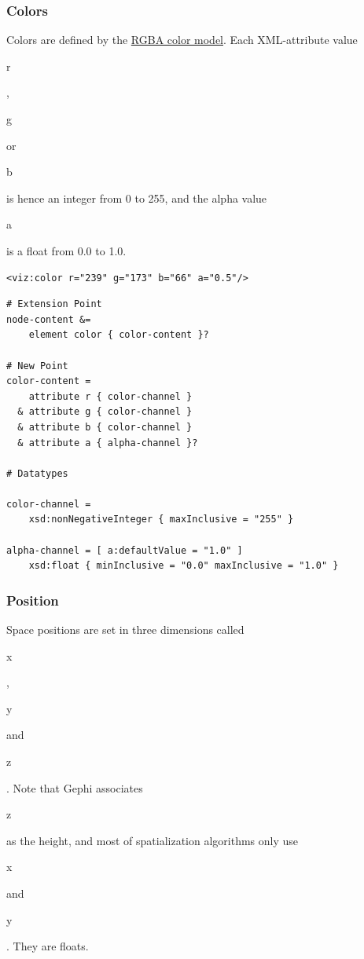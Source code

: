 \documentclass[a4paper,10pt]{article}
\begin{document}
\subsubsection{Colors}

Colors are defined by the \href{http://en.wikipedia.org/wiki/RGBA}{RGBA color model}. Each XML-attribute value \begin{footnotesize}r\end{footnotesize}, \begin{footnotesize}g\end{footnotesize} or \begin{footnotesize}b\end{footnotesize} is hence an integer from 0 to 255, and the alpha value \begin{footnotesize}a\end{footnotesize} is a float from 0.0 to 1.0.

\lstset{ style=gexf }
\begin{lstlisting}[caption={VIZ Color Declaration},label=vizcolor]
<viz:color r="239" g="173" b="66" a="0.5"/>
\end{lstlisting}

\lstset{ style=rnc }
\begin{lstlisting}[caption={Color Specification},label=colorRNC]
# Extension Point
node-content &=
    element color { color-content }?

# New Point
color-content =
    attribute r { color-channel }
  & attribute g { color-channel }
  & attribute b { color-channel }
  & attribute a { alpha-channel }?

# Datatypes

color-channel =
    xsd:nonNegativeInteger { maxInclusive = "255" }

alpha-channel = [ a:defaultValue = "1.0" ]
    xsd:float { minInclusive = "0.0" maxInclusive = "1.0" }
\end{lstlisting}

\subsubsection{Position}

Space positions are set in three dimensions called \begin{footnotesize}x\end{footnotesize}, \begin{footnotesize}y\end{footnotesize} and \begin{footnotesize}z\end{footnotesize}. Note that Gephi associates \begin{footnotesize}z\end{footnotesize} as the height, and most of spatialization algorithms only use \begin{footnotesize}x\end{footnotesize} and \begin{footnotesize}y\end{footnotesize}. They are floats.
\end{document}

